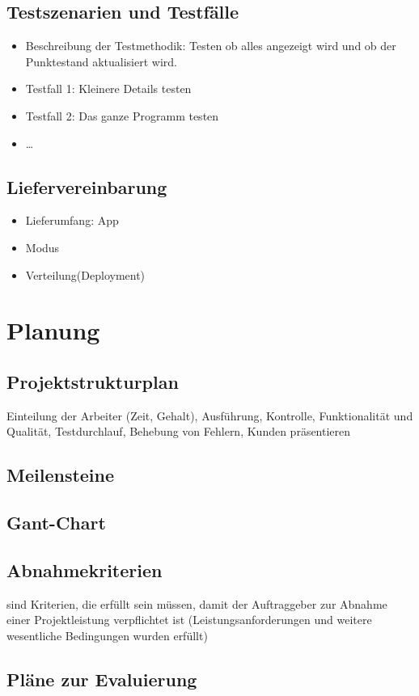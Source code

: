\subsection{Testszenarien und Testfälle}
\begin{itemize}
	\item Beschreibung der Testmethodik:
	Testen ob alles angezeigt wird und ob der Punktestand aktualisiert wird.
	\item Testfall 1:
	Kleinere Details testen
	\item Testfall 2:
	Das ganze Programm testen
	\item \ldots
\end{itemize}
\subsection{Liefervereinbarung}
\begin{itemize}
	\item Lieferumfang: App
	\item Modus
	\item Verteilung(Deployment)
\end{itemize}
\section{Planung}
\subsection{Projektstrukturplan}

Einteilung der Arbeiter (Zeit, Gehalt), Ausführung, Kontrolle, Funktionalität und Qualität, Testdurchlauf, Behebung von Fehlern, Kunden präsentieren 
\subsection{Meilensteine}
\subsection{Gant-Chart}
\subsection{Abnahmekriterien}

sind Kriterien, die erfüllt sein müssen, damit der Auftraggeber zur Abnahme einer Projektleistung verpflichtet ist (Leistungsanforderungen und weitere wesentliche Bedingungen wurden erfüllt)
\subsection{Pläne zur Evaluierung}
